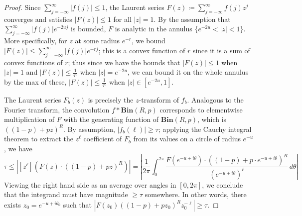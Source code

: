 \documentclass[11pt]{article}
\theoremstyle{plain}
\newcommand{\Bin}[2]{\textbf{Bin}(#1,#2)}
\begin{document}
\begin{proof}
      Since $\sum_{j=-\infty}^{\infty} |f(j)| \leq 1$, the Laurent series $F(z) \coloneqq \sum_{j=-\infty}^{\infty} f(j)z^j$ converges and satisfies $|F(z)| \leq 1$ for all $|z| = 1$. By the assumption that $\sum_{j=-\infty}^{\infty} |f(j)|e^{-2uj}$ is bounded, $F$ is analytic in the annulus $\{e^{-2u} < |z| < 1\}$. More specifically, for $z$ at some radius $e^{-r}$, we bound $|F(z)|\leq \sum_{j=-\infty}^{\infty} |f(j)|e^{-rj}$; this is a convex function of $r$ since it is a sum of convex functions of $r$; thus since we have the bounds that $|F(z)|\leq 1$ when $|z|=1$ and $|F(z)|\leq \frac{1}{\tau^c}$ when $|z|=e^{-2u}$, we can bound it on the whole annulus by the max of these, $|F(z)|\leq \frac{1}{\tau^c}$ when $|z|\in[e^{-2u},1]$.
      
      The Laurent series $F_b(z)$ is precisely the $z$-transform of $f_b$. Analogous to the Fourier transform, the convolution $f \ast \Bin{R}{p}$ corresponds to elementwise multiplication of $F$ with the generating function of $\Bin{R}{p}$, which is $((1-p)+pz)^R$. By assumption, $|f_b(\ell)| \geq \tau$; applying the Cauchy integral theorem to extract the $z^\ell$ coefficient of $F_b$ from its values on a circle of radius $e^{-u}$, we have
    \begin{equation}\label{eq:Cauchy}
        \tau\leq |[z^\ell](F(z)\cdot ((1-p)+p z)^R)| = \left|\frac{1}{2\pi}\int_0^{2\pi} \frac{F(e^{-u+i\theta})\cdot ((1-p)+p \cdot e^{-u+i\theta})^R}{(e^{-u+i\theta })^\ell}\,d\theta\right|
    \end{equation}
    Viewing the right hand side as an average over angles in $[0,2\pi]$, we conclude that the integrand must have magnitude $\geq \tau$ somewhere. In other words, there exists $z_0=e^{-u+i\theta_0}$ such that $|F(z_0)((1-p)+p z_0)^R z_0^{-\ell}|\geq \tau$.


\end{proof}
\end{document}
